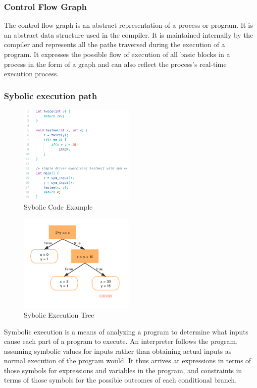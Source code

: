 \documentclass[a4paper, 10pt, conference, twocolumn]{ieeeconf}       %
\begin{document}
\subsubsection{Control Flow Graph}
The control flow graph is an abstract representation of a process or program.
It is an abstract data structure used in the compiler.
It is maintained internally by the compiler and represents all the paths traversed during the execution of a program. It expresses the possible flow of execution of all basic blocks in a process in the form of a graph
and can also reflect the process's real-time execution process.

\subsubsection{Sybolic execution path}

\begin{figure}[h]
    \centering
    \includegraphics[width=0.5\textwidth]{figures/sym_code.png}
    \caption{Sybolic Code Example}
\end{figure}
\begin{figure}[h]
    \centering
    \includegraphics[width=0.5\textwidth]{figures/sym_graph.jpg}
    \caption{Sybolic Execution Tree}
\end{figure}

Symbolic execution is a means of analyzing a program to determine what inputs cause each part of a program to execute.
An interpreter follows the program,
assuming symbolic values for inputs rather than obtaining actual inputs as normal execution of the program would.
It thus arrives at expressions in terms of those symbols for expressions and variables in the program,
and constraints in terms of those symbols for the possible outcomes of each conditional branch.
\end{document}
